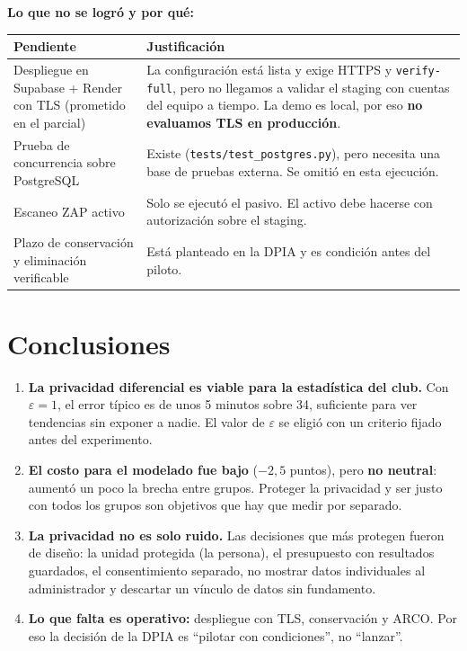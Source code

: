\documentclass[11pt]{article}
\begin{document}
\textbf{Lo que no se logró y por qué:}
\begin{table}[H]
\centering\small
\begin{tabularx}{\textwidth}{@{}p{5cm}Y@{}}
\toprule
\textbf{Pendiente} & \textbf{Justificación} \\
\midrule
Despliegue en Supabase + Render con TLS (prometido en el parcial) & La configuración está lista y exige HTTPS y \texttt{verify-full}, pero no llegamos a validar el staging con cuentas del equipo a tiempo. La demo es local, por eso \textbf{no evaluamos TLS en producción}. \\
Prueba de concurrencia sobre PostgreSQL & Existe (\texttt{tests/test\_postgres.py}), pero necesita una base de pruebas externa. Se omitió en esta ejecución. \\
Escaneo ZAP activo & Solo se ejecutó el pasivo. El activo debe hacerse con autorización sobre el staging. \\
Plazo de conservación y eliminación verificable & Está planteado en la DPIA y es condición antes del piloto. \\
\bottomrule
\end{tabularx}
\end{table}

\section{Conclusiones}
\begin{enumerate}[nosep]
  \item \textbf{La privacidad diferencial es viable para la estadística del club.} Con $\varepsilon = 1$, el error típico es de unos 5 minutos sobre 34, suficiente para ver tendencias sin exponer a nadie. El valor de $\varepsilon$ se eligió con un criterio fijado antes del experimento.
  \item \textbf{El costo para el modelado fue bajo} ($-2{,}5$ puntos), pero \textbf{no neutral}: aumentó un poco la brecha entre grupos. Proteger la privacidad y ser justo con todos los grupos son objetivos que hay que medir por separado.
  \item \textbf{La privacidad no es solo ruido.} Las decisiones que más protegen fueron de diseño: la unidad protegida (la persona), el presupuesto con resultados guardados, el consentimiento separado, no mostrar datos individuales al administrador y descartar un vínculo de datos sin fundamento.
  \item \textbf{Lo que falta es operativo:} despliegue con TLS, conservación y ARCO. Por eso la decisión de la DPIA es ``pilotar con condiciones'', no ``lanzar''.
\end{enumerate}
\end{document}
